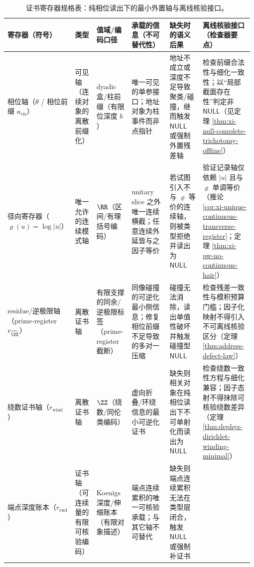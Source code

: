 \begin{table}[H]
\centering
\scriptsize
\setlength{\tabcolsep}{6pt}
\renewcommand{\arraystretch}{1.2}
\caption{证书寄存器规格表：纯相位读出下的最小外置轴与离线核验接口。}
\label{tab:cdim-certificate-register-spec}
\begin{tabular}{@{}
>{\raggedright\arraybackslash}p{0.14\linewidth}
>{\raggedright\arraybackslash}p{0.09\linewidth}
>{\raggedright\arraybackslash}p{0.15\linewidth}
>{\raggedright\arraybackslash}p{0.20\linewidth}
>{\raggedright\arraybackslash}p{0.18\linewidth}
>{\raggedright\arraybackslash}p{0.22\linewidth}
@{}}
\toprule
寄存器（符号） & 类型 & 值域/编码口径 & 承载的信息（不可替代性） & 缺失时的语义后果 & 离线核验接口（检查器要点） \\
\midrule
相位轴（\(\theta\) / 相位前缀 \(a_{\mathrm{vis}}\)） &
可见轴（连续对象的离散前缀化） &
dyadic 盒/柱前缀（有限位深度 \(b\)） &
唯一可见的单参接口；地址对象为柱事件而非点指针 &
地址不成立或深度不足导致聚类/碰撞，继而触发 \(\mathsf{NULL}\) 或强制外置残差轴 &
检查前缀合法性与细化一致性；以“局部截面存在性”判定非 \(\mathsf{NULL}\)（见定理 \ref{thm:xi-null-complete-trichotomy-offline}） \\
\addlinespace
径向寄存器（\(\varrho(u)=\log|u|\)） &
唯一允许的连续模式轴 &
\(\RR\)（区间/有理括号编码） &
unitary slice 之外唯一连续横截；任意连续外延皆与之因子等价 &
若试图引入不与 \(\varrho\) 等价的连续轴，则被类型拒绝并读出为 \(\mathsf{NULL}\) &
验证记录轴仅依赖 \(|u|\) 且与 \(\varrho\) 单调等价（推论 \ref{cor:xi-unique-continuous-transverse-register}；定理 \ref{thm:xi-pw-no-continuous-hair}） \\
\addlinespace
residue/逆极限轴（prime-register \(r_{\widehat{\ZZ}}\)） &
离散证书轴 &
有限支撑的同余/逆极限标签（prime-register 截断） &
同像碰撞的可逆化最小侧信息；修复相位前缀不足导致的多对一压缩 &
碰撞无法消除，读出单值性破坏并触发碰撞型 \(\mathsf{NULL}\) &
检查残差一致性与模积预算门槛；因子化映射不得引入不可离线核验区分（定理 \ref{thm:address-defect-law}） \\
\addlinespace
绕数证书轴（\(r_{\mathrm{wind}}\)） &
离散证书轴 &
\(\ZZ\)（绕数/同伦类编码） &
虚向折叠/环绕信息的最小可逆化证书 &
缺失则相关对象在纯相位读出下不可单射化而读出为 \(\mathsf{NULL}\) &
检查绕数一致性方程与细化兼容；因子态射不得抹除可核验绕数差异（定理 \ref{thm:dephys-dirichlet-winding-minimal}） \\
\addlinespace
端点深度账本（\(r_{\mathrm{end}}\)） &
证书轴（可连续量的有限可核验编码） &
Koenigs 深度/伸缩账本（有限对象描述） &
端点连续累积的唯一可核验承载；与其它轴不可替代 &
缺失则端点连续累积无法在类型层闭合，触发 \(\mathsf{NULL}\) 或强制补证书 &

\end{tabular}
\end{table}
